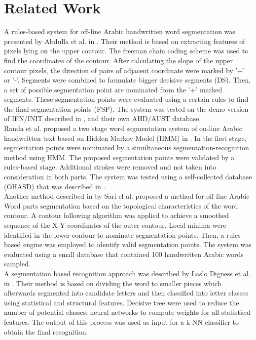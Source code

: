 \documentclass[journal,compsoc]{IEEEtran}
\begin{document}
\section{Related Work}
\label{sec:related_word}
A rules-based system for off-line Arabic handwritten word segmentation was presented by Abdulla et al. in \cite{abdulla2008off}. Their method is based on extracting features of pixels lying on the upper contour. The freeman chain coding scheme was used to find the coordinates of the contour. After calculating the slope of the upper contour pixels, the direction of pairs of adjacent coordinate were marked by '+' or '-'. Segments were combined to formulate bigger decisive segments (DS). Then, a set of possible segmentation point are nominated from the '+' marked segments. These segmentation points were evaluated using a certain rules to find the final segmentation points (FSP). The system was tested on the demo version of IFN/INIT described in \cite{pechwitz2002ifn} , and their own AHD/AUST database.\\

Randa et al. proposed a two stage word segmentation system of on-line Arabic handwritten text based on Hidden Markov Model (HMM) in \cite{elanwar2012unconstrained}. In the first stage, segmentation points were nominated by a simultaneous segmentation-recognition method using HMM. The proposed segmentation points were validated by a rules-based stage. Additional strokes were removed and not taken into consideration in both parts. The system was tested using a self-collected database (OHASD) that was described in \cite{elanwar2010ohasd}.\\

Another method described in \cite{sari2002off} by Sari el al. proposed a method for off-line Arabic Word parts segmentation based on the topological characteristics of the word contour. A contour following  algorithm was applied to achieve a smoothed sequence of the X-Y coordinates of the outer contour. Local minima were identified in the lower contour to nominate segmentation points. Then, a rules based engine was employed to identify valid segmentation points. The system was evaluated using a small database that contained 100 handwritten Arabic words sampled.\\

A segmentation based recognition approach was described by Laslo Digness et al. in \cite{Dinges2011}. Their method is based on dividing the word to smaller pieces which afterwards segmented into candidate letters and then classified into letter classes using statistical and structural features. Decisive tree were used to reduce the number of potential classes; neural networks to compute weights for all statistical features. The output of this process was used as input for a k-NN classifier to obtain the final recognition.\\
\end{document}
